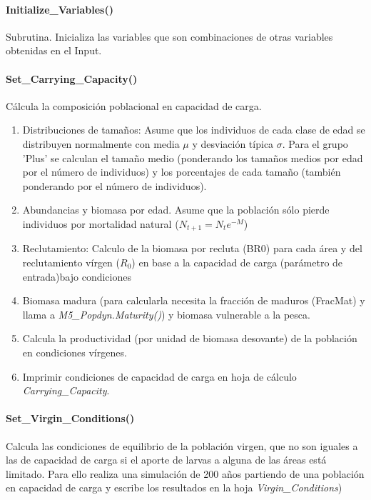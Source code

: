 \documentclass[12pt, oneside, a4paper]{article}
\begin{document}
			\paragraph{Initialize\_Variables()}
				Subrutina. Inicializa las variables que son combinaciones de otras variables obtenidas en el Input. 
			\paragraph{Set\_Carrying\_Capacity()}
				Cálcula la composición poblacional en capacidad de carga. 
					\begin{enumerate}
						\item Distribuciones de tamaños: Asume que los individuos de cada clase de edad se distribuyen normalmente con media $\mu$ y desviación típica $\sigma$. Para el grupo 'Plus' se calculan el tamaño medio (ponderando los tamaños medios por edad por el número de individuos) y los porcentajes de cada tamaño (también ponderando por el número de individuos). 
						\item Abundancias y biomasa por edad. Asume que la población sólo pierde individuos por mortalidad natural ($N_{t+1}=N_t e^{-M}$)
						\item Reclutamiento: Calculo de la biomasa por recluta (BR0) para cada área y del reclutamiento vírgen ($R_0$) en base a la capacidad de carga (parámetro de entrada)bajo condiciones  
						\item Biomasa madura (para calcularla necesita la fracción de maduros (FracMat) y llama a \emph{M5\_Popdyn.Maturity()}) y biomasa vulnerable a la pesca. 
						\item Calcula la productividad (por unidad de biomasa desovante) de la población en condiciones vírgenes. 
						\item Imprimir condiciones de capacidad de carga en hoja de cálculo \emph{Carrying\_Capacity}. 
					\end{enumerate}
			\paragraph{Set\_Virgin\_Conditions()}
			Calcula las condiciones de equilibrio de la población virgen, que no son iguales a las de capacidad de carga si el aporte de larvas a alguna de las áreas está limitado. 
			Para ello realiza una simulación de 200 años partiendo de una población en capacidad de carga y escribe los resultados en la hoja \emph{Virgin\_Conditions})
\end{document}
